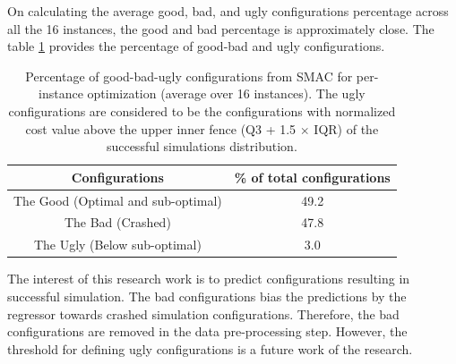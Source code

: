 On calculating the average good, bad, and ugly configurations percentage across all the 16 instances, the good and bad percentage is approximately close. The table \ref{table:configuration_split} provides the percentage of good-bad and ugly configurations.

\begin{table}[!ht]
\centering
\begin{tabular}{|c|c|}
\hline
\textbf{Configurations} & \textbf{\% of total configurations} \\ \hline
The Good (Optimal and sub-optimal) & 49.2 \\ \hline
The Bad (Crashed) & 47.8 \\ \hline
The Ugly (Below sub-optimal) & 3.0 \\ \hline
\end{tabular}
\captionsetup{justification=justified}
\caption[Percentage of good-bad-ugly configurations from SMAC]{Percentage of good-bad-ugly configurations from SMAC for per-instance optimization (average over 16 instances). The ugly configurations are considered to be the configurations with normalized cost value above the upper inner fence (Q3 + 1.5 $\times$ IQR) of the successful simulations distribution.}
\label{table:configuration_split}
\end{table}

The interest of this research work is to predict configurations resulting in successful simulation. The bad configurations bias the predictions by the regressor towards crashed simulation configurations. Therefore, the bad configurations are removed in the data pre-processing step. However, the threshold for defining ugly configurations is a future work of the research.



